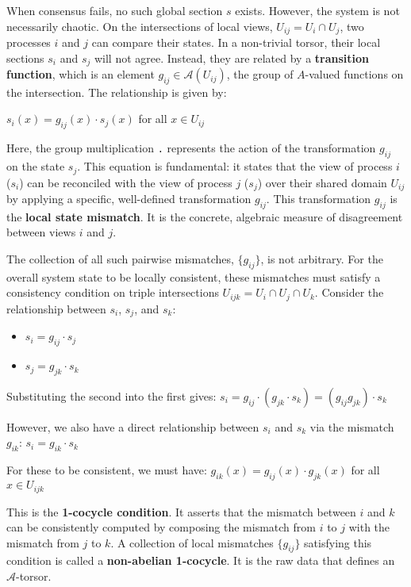\documentclass[
]{article}
\providecommand{\tightlist}{%
  \setlength{\itemsep}{0pt}\setlength{\parskip}{0pt}}
\begin{document}
When consensus fails, no such global section \(s\) exists. However, the
system is not necessarily chaotic. On the intersections of local views,
\(U_{ij} = U_i \cap U_j\), two processes \(i\) and \(j\) can compare
their states. In a non-trivial torsor, their local sections \(s_i\) and
\(s_j\) will not agree. Instead, they are related by a
\textbf{transition function}, which is an element
\(g_{ij} \in \mathcal{A}(U_{ij})\), the group of \(A\)-valued functions
on the intersection. The relationship is given by:

\(s_i(x) = g_{ij}(x) \cdot s_j(x)\) for all \(x \in U_{ij}\)

Here, the group multiplication \texttt{.} represents the action of the
transformation \(g_{ij}\) on the state \(s_j\). This equation is
fundamental: it states that the view of process \(i\) (\(s_i\)) can be
reconciled with the view of process \(j\) (\(s_j\)) over their shared
domain \(U_{ij}\) by applying a specific, well-defined transformation
\(g_{ij}\). This transformation \(g_{ij}\) is the \textbf{local state
mismatch}. It is the concrete, algebraic measure of disagreement between
views \(i\) and \(j\).

The collection of all such pairwise mismatches, \(\{g_{ij}\}\), is not
arbitrary. For the overall system state to be locally consistent, these
mismatches must satisfy a consistency condition on triple intersections
\(U_{ijk} = U_i \cap U_j \cap U_k\). Consider the relationship between
\(s_i\), \(s_j\), and \(s_k\):

\begin{itemize}
\tightlist
\item
  \(s_i = g_{ij} \cdot s_j\)
\item
  \(s_j = g_{jk} \cdot s_k\)
\end{itemize}

Substituting the second into the first gives:
\(s_i = g_{ij} \cdot (g_{jk} \cdot s_k) = (g_{ij} g_{jk}) \cdot s_k\)

However, we also have a direct relationship between \(s_i\) and \(s_k\)
via the mismatch \(g_{ik}\): \(s_i = g_{ik} \cdot s_k\)

For these to be consistent, we must have:
\(g_{ik}(x) = g_{ij}(x) \cdot g_{jk}(x)\) for all \(x \in U_{ijk}\)

This is the \textbf{1-cocycle condition}. It asserts that the mismatch
between \(i\) and \(k\) can be consistently computed by composing the
mismatch from \(i\) to \(j\) with the mismatch from \(j\) to \(k\). A
collection of local mismatches \(\{g_{ij}\}\) satisfying this condition
is called a \textbf{non-abelian 1-cocycle}. It is the raw data that
defines an \(\mathcal{A}\)-torsor.
\end{document}
